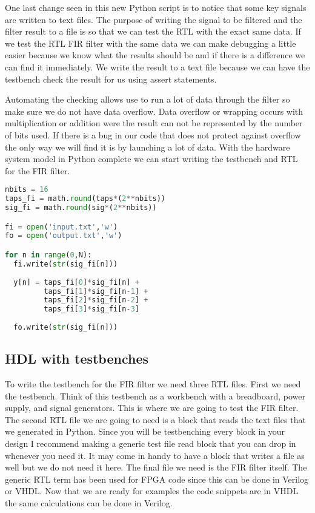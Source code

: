 One last change seen in this new Python script is to notice that some key signals are written to text files. The purpose of writing the signal to be filtered and the filter result to a file is so that we can test the \ac{RTL} with the exact same data. If we test the \ac{RTL} \ac{FIR} filter with the same data we can make debugging a little easier because we know what the results should be and if there is a difference we can find it immediately. We write the result to a text file because we can have the testbench check the result for us using assert statements. 

Automating the checking allows use to run a lot of data through the filter so make sure we do not have data overflow. Data overflow or wrapping occurs with multiplication or addition were the result can not be represented by the number of bits used. If there is a bug in our code that does not protect against overflow the only way we will find it is by launching a lot of data.  With the hardware system model in Python complete we can start writing the testbench and \ac{RTL} for the \ac{FIR} filter.

\begin{lstlisting}[language=Python]
nbits = 16
taps_fi = math.round(taps*(2**nbits))
sig_fi = math.round(sig*(2**nbits))

fi = open('input.txt','w')
fo = open('output.txt','w')

for n in range(0,N):
  fi.write(str(sig_fi[n]))
	
  y[n] = taps_fi[0]*sig_fi[n] + 
         taps_fi[1]*sig_fi[n-1] + 
         taps_fi[2]*sig_fi[n-2] + 
         taps_fi[3]*sig_fi[n-3] 
	
  fo.write(str(sig_fi[n]))
\end{lstlisting}

	
\subsection{HDL with testbenches}
\label{sec:hdlwtbs}
To write the testbench for the \ac{FIR} filter we need three \ac{RTL} files. First we need the testbench. Think of this testbench as a workbench with a breadboard, power supply, and signal generators. This is where we are going to test the \ac{FIR} filter. The second \ac{RTL} file we are going to need is a block that reads the text files that we generated in Python. Since you will be testbenching every block in your design I recommend making a generic test file read block that you can drop in whenever you need it. It may come in handy to have a block that writes a file as well but we do not need it here. The final file we need is the \ac{FIR} filter itself. The generic \ac{RTL} term has been used for \ac{FPGA} code since this can be done in Verilog or \ac{VHDL}. Now that we are ready for examples the code snippets are in \ac{VHDL} the same calculations can be done in Verilog.


